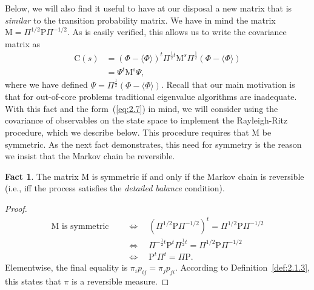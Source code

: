 \documentclass[12pt,letterpaper]{report}
\theoremstyle{plain}
\theoremstyle{definition}
\newtheorem{fact}{Fact}[chapter]
\theoremstyle{remark}
\numberwithin{theorem}{chapter}
\numberwithin{claim}{chapter}
\numberwithin{equation}{chapter}
\numberwithin{conjecture}{chapter}
\newcommand\C{\ensuremath{\mathrm{C}}}
\renewcommand\P{\ensuremath{\mathrm{P}}}
\newcommand\M{\ensuremath{\mathrm{M}}}
\newcommand\pij{\ensuremath{p_{ij}}}
\newcommand\pji{\ensuremath{p_{ji}}}
\newcommand\<{\ensuremath{\langle}}
\renewcommand\>{\ensuremath{\rangle}}
\begin{document}
Below, we will also find it useful to have at our disposal a new matrix that is \emph{similar} to the
transition probability matrix. We have in mind the matrix 
$\M = \Pi^{1/2}\P\Pi^{-1/2}$. 
As is easily verified, this allows us to write the covariance matrix as
\begin{align}
\label{eq:2.7}
\C(s) &= 
(\Phi - \<\Phi\>)^t \Pi^{\frac{1}{2}t}\M^s\Pi^{\frac{1}{2}}(\Phi - \<\Phi\>)\nonumber\\
&=\Psi^t \M^s \Psi,  %
\end{align}
where we have defined $\Psi = \Pi^{\frac{1}{2}}(\Phi - \<\Phi\>)$. Recall that
our main motivation is that for out-of-core problems traditional eigenvalue
algorithms are inadequate. With this fact and the form~(\ref{eq:2.7}) %
in 
%
%
%
%
mind, we will consider using the covariance of observables on the state space to implement the
Rayleigh-Ritz procedure, which we describe below. This procedure requires
that $\M$ be symmetric. As the next fact demonstrates, 
this need for symmetry is the reason we insist that the Markov chain be reversible.
\begin{fact}
The matrix $\M$ is symmetric if and only if the Markov chain is reversible (i.e., iff the
process satisfies the \emph{detailed balance} condition).
\end{fact}
\begin{proof}
  \begin{align*}
  \M \text{ is symmetric } 
& \quad \Longleftrightarrow  \quad
 (\Pi^{1/2}\P\Pi^{-1/2})^t = \Pi^{1/2}\P\Pi^{-1/2}\\
& \quad \Longleftrightarrow  \quad
 \Pi^{-\frac{1}{2}t}\P^t\Pi^{\frac{1}{2}t} = \Pi^{1/2}\P\Pi^{-1/2}\\
& \quad \Longleftrightarrow  \quad
 \P^t\Pi^t = \Pi\P.
  \end{align*}
Elementwise, the final equality is $\pi_i\pij = \pi_j\pji$. 
According to Definition~\ref{def:2.1.3}, this states
that $\pi$ is a reversible measure.
\end{proof}


\end{document}
